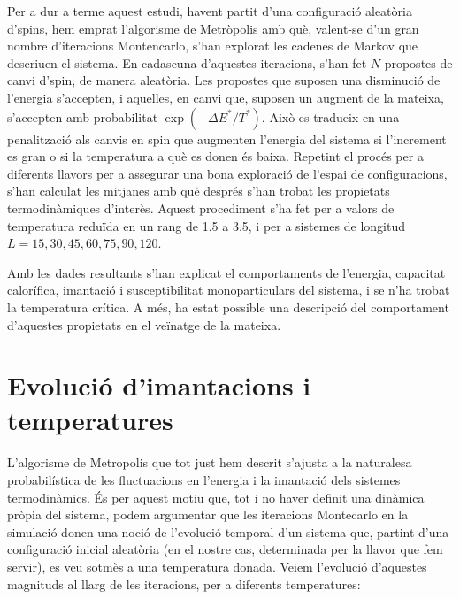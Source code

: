 \documentclass[a4paper]{article}
\begin{document}
Per a dur a terme aquest estudi, havent partit d'una configuració aleatòria d'spins, hem emprat l'algorisme de Metròpolis amb què, valent-se d'un gran nombre d'iteracions Montencarlo, s'han explorat les cadenes de Markov que descriuen el sistema. En cadascuna d'aquestes iteracions, s'han fet $N$ propostes de canvi d'spin, de manera aleatòria. Les propostes que suposen una disminució de l'energia s'accepten, i aquelles, en canvi que, suposen un augment de la mateixa, s'accepten amb probabilitat $\exp\left(-\Delta E^*/T^*\right)$. Això es tradueix en una penalització als canvis en spin que augmenten l'energia del sistema si l'increment es gran o si la temperatura a què es donen és baixa. Repetint el procés per a diferents llavors per a assegurar una bona exploració de l'espai de configuracions, s'han calculat les mitjanes amb què després s'han trobat les propietats termodinàmiques d'interès. Aquest procediment s'ha fet per a valors de temperatura reduïda en un rang de 1.5 a 3.5, i per a sistemes de longitud $L=15,30,45,60,75,90,120$.

Amb les dades resultants s'han explicat el comportaments de l'energia, capacitat calorífica, imantació i susceptibilitat monoparticulars del sistema, i se n'ha trobat la temperatura crítica. A més, ha estat possible una descripció del comportament d'aquestes propietats en el veïnatge de la mateixa.

\section{Evolució d'imantacions i temperatures}

L'algorisme de Metropolis que tot just hem descrit s'ajusta a la naturalesa probabilística de les fluctuacions en l'energia i la imantació dels sistemes termodinàmics. És per aquest motiu que, tot i no haver definit una dinàmica pròpia del sistema, podem argumentar que les iteracions Montecarlo en la simulació donen una noció de l'evolució temporal d'un sistema que, partint d'una configuració inicial aleatòria (en el nostre cas, determinada per la llavor que fem servir), es veu sotmès a una temperatura donada. Veiem l'evolució d'aquestes magnituds al llarg de les iteracions, per a diferents temperatures:
\end{document}

